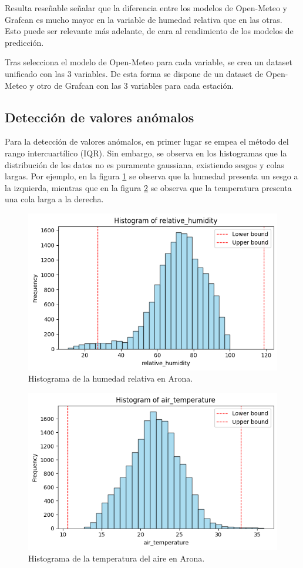  Resulta reseñable señalar que la diferencia entre los modelos de Open-Meteo y Grafcan es mucho mayor en la variable 
 de humedad relativa que en las otras. Esto puede ser relevante más adelante, de cara al rendimiento de los modelos de predicción. 

 \bigskip
 Tras selecciona el modelo de Open-Meteo para cada variable, se crea un dataset unificado con las 3 variables. De esta forma se dispone 
 de un dataset de Open-Meteo y otro de Grafcan con las 3 variables para cada estación.

\subsection{Detección de valores anómalos}
Para la detección de valores anómalos, en primer lugar se empea el método del rango intercuartílico (IQR). 
Sin embargo, se observa en los histogramas que la distribución de los datos no es puramente gaussiana, existiendo sesgos y colas largas.
Por ejemplo, en la figura \ref{histogram_1} se observa que la humedad presenta un sesgo a la izquierda, mientras que en la figura 
\ref{histogram_2} se observa que la temperatura presenta una cola larga a la derecha.

\begin{figure}
    \centering
    \includegraphics[width=.5\linewidth]{images/histogram_humidity.png}
    \caption{Histograma de la humedad relativa en Arona.}
    \label{histogram_1}
\end{figure}

\begin{figure}
    \centering
    \includegraphics[width=.5\linewidth]{images/histogram_temperature.png}
    \caption{Histograma de la temperatura del aire en Arona.}
    \label{histogram_2}
\end{figure}

